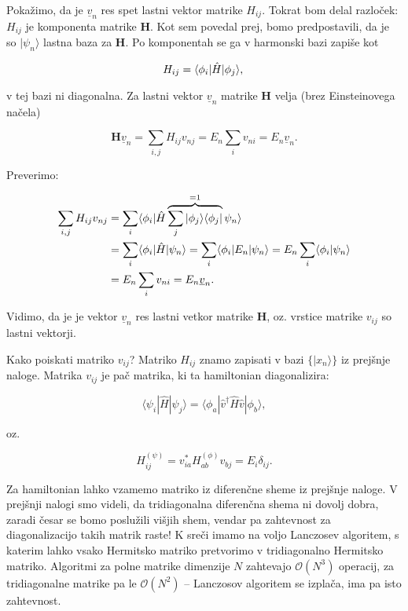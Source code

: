 \documentclass[a4 paper, 12pt]{article}
\begin{document}
Pokažimo, da je $\underline{v}_n$ res spet lastni vektor matrike $H_{ij}$. Tokrat bom delal razloček: $H_{ij}$
je komponenta matrike $\mathbf{H}$. Kot sem povedal prej, bomo predpostavili, da je so $|\psi_n\rangle$ lastna baza
za $\mathbf{H}$. Po komponentah se ga v harmonski bazi zapiše kot

\[
	H_{ij} = \langle\phi_i|\hat{H}|\phi_j\rangle, \\
\]

v tej bazi ni diagonalna. Za lastni vektor $\underline{v}_n$ matrike $\mathbf{H}$ velja (brez Einsteinovega načela)

\[
	\mathbf{H}\underline{v}_n = \sum_{i,j} H_{ij}v_{nj} = E_n \sum_{i} v_{ni} = E_n \underline{v}_n.
\]

Preverimo:

\begin{align}
	\sum_{i,j} H_{ij}v_{nj} &= \sum_i \langle\phi_i|\hat{H}\overbrace{\sum_j |\phi_j\rangle\langle\phi_j|}^{= 1}\psi_n\rangle \notag \\
	&= \sum_i \langle\phi_i|\hat{H}|\psi_n\rangle = \sum_i \langle\phi_i|E_n|\psi_n\rangle = E_n \sum_i \langle\phi_i|\psi_n\rangle \notag \\
	&= E_n \sum_i v_{ni} = E_n \underline{v}_n. \label{dokaz}
\end{align}

Vidimo, da je je vektor $\underline{v}_n$ res lastni vetkor matrike $\mathbf{H}$, oz. vrstice matrike $v_{ij}$ so
lastni vektorji.

Kako poiskati matriko $v_{ij}$? Matriko $H_{ij}$ znamo zapisati v bazi $\big\{|x_n\rangle\big\}$ iz prejšnje naloge.
Matrika $v_{ij}$ je pač matrika, ki ta hamiltonian diagonalizira:

\[
	\langle\psi_i|\hat{H}|\psi_j\rangle = \langle\phi_a|\hat{v}^\dagger\hat{H}\hat{v}|\phi_b\rangle,
\]

oz.

\[
	H^{(\psi)}_{ij} = v_{ia}^* H^{(\phi)}_{ab} v_{bj} = E_i\delta_{ij}.
\]

Za hamiltonian lahko vzamemo matriko iz diferenčne sheme iz prejšnje naloge. V prejšnji nalogi smo videli, da
tridiagonalna diferenčna shema ni dovolj dobra, zaradi česar se bomo poslužili višjih shem, vendar pa zahtevnost
za diagonalizacijo takih matrik raste! K sreči imamo na voljo Lanczosev algoritem, s katerim lahko vsako Hermitsko matriko
pretvorimo v tridiagonalno Hermitsko matriko. Algoritmi za polne matrike dimenzije $N$ zahtevajo $\mathcal{O}(N^3)$
operacij, za tridiagonalne matrike pa le $\mathcal{O}(N^2)$ -- Lanczosov algoritem se izplača, ima pa isto zahtevnost.
\end{document}
